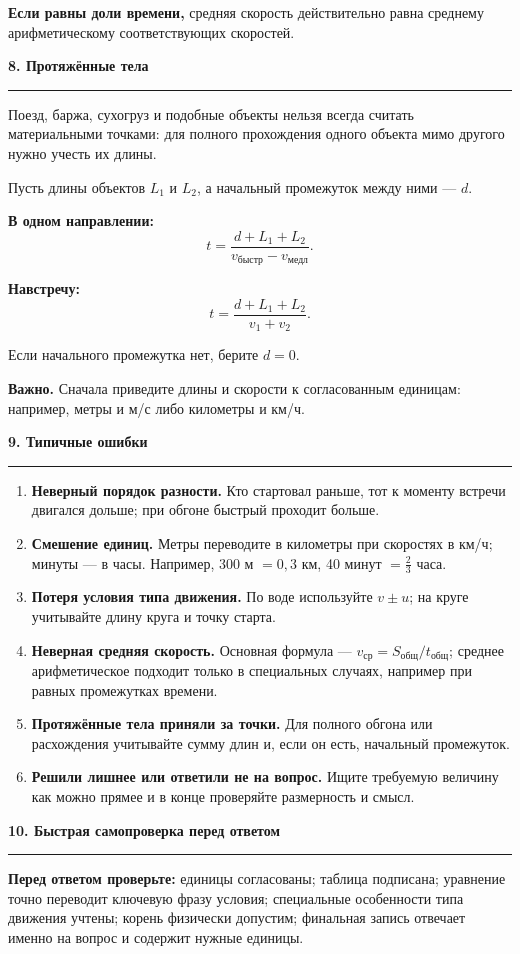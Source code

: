 \documentclass[a4paper,12pt]{article}
\newcommand{\sectiontitle}[1]{%
  \vspace{2mm}%
  {\Large\bfseries\color{darkaccent}#1}\par
  \vspace{1mm}\color{rulegray}\hrule\color{textgray}\vspace{3mm}%
}
\newcommand{\key}[1]{\textbf{\color{darkaccent}#1}}
\newcommand{\formula}[1]{\[\displaystyle #1\]}
\begin{document}
\textbf{Если равны доли времени,} средняя скорость действительно равна среднему арифметическому соответствующих скоростей.

\clearpage
\sectiontitle{8. Протяжённые тела}

Поезд, баржа, сухогруз и подобные объекты нельзя всегда считать материальными точками: для полного прохождения одного объекта мимо другого нужно учесть их длины.

Пусть длины объектов $L_1$ и $L_2$, а начальный промежуток между ними — $d$.

\textbf{В одном направлении:}
\formula{t=\frac{d+L_1+L_2}{v_{\text{быстр}}-v_{\text{медл}}}.}

\textbf{Навстречу:}
\formula{t=\frac{d+L_1+L_2}{v_1+v_2}.}

Если начального промежутка нет, берите $d=0$.

\key{Важно.} Сначала приведите длины и скорости к согласованным единицам: например, метры и м/с либо километры и км/ч.

\sectiontitle{9. Типичные ошибки}

\begin{enumerate}[itemsep=1mm]
  \item \textbf{Неверный порядок разности.} Кто стартовал раньше, тот к моменту встречи двигался дольше; при обгоне быстрый проходит больше.
  \item \textbf{Смешение единиц.} Метры переводите в километры при скоростях в км/ч; минуты — в часы. Например, 300 м $=0{,}3$ км, 40 минут $=\frac23$ часа.
  \item \textbf{Потеря условия типа движения.} По воде используйте $v\pm u$; на круге учитывайте длину круга и точку старта.
  \item \textbf{Неверная средняя скорость.} Основная формула — $v_{\text{ср}}=S_{\text{общ}}/t_{\text{общ}}$; среднее арифметическое подходит только в специальных случаях, например при равных промежутках времени.
  \item \textbf{Протяжённые тела приняли за точки.} Для полного обгона или расхождения учитывайте сумму длин и, если он есть, начальный промежуток.
  \item \textbf{Решили лишнее или ответили не на вопрос.} Ищите требуемую величину как можно прямее и в конце проверяйте размерность и смысл.
\end{enumerate}

\sectiontitle{10. Быстрая самопроверка перед ответом}

\textbf{Перед ответом проверьте:} единицы согласованы; таблица подписана; уравнение точно переводит ключевую фразу условия; специальные особенности типа движения учтены; корень физически допустим; финальная запись отвечает именно на вопрос и содержит нужные единицы.
\end{document}
